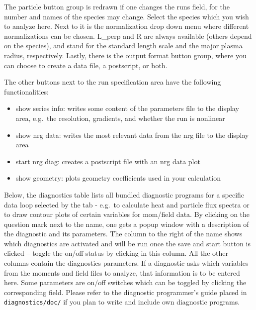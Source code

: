 \documentclass[12pt]{article}
\begin{document}
The particle button group is redrawn if one changes the runs
field, for the number and names of the species may change. Select
the species which you wish to analyze here. Next to it is the
normalization drop down menu where different normalizations can be
chosen. L\_perp and R are always available (others depend on the
species), and stand for the standard \gene length scale and the
major plasma radius, respectively. Lastly, there is the output
format button group, where you can choose to create a data file, a
postscript, or both.

The other buttons next to the run specification area have the
following functionalities:
\begin{itemize}
\item show series info: writes some content of the parameters file
to the display area, e.g.~the resolution, gradients, and whether
the run is nonlinear
\item show nrg data: writes the most relevant data from the nrg
file to the display area
\item start nrg diag: creates a postscript file with an nrg data plot
\item show geometry: plots geometry coefficients used in your
\gene calculation
\end{itemize}

Below, the diagnostics table lists all bundled diagnostic
programs for a specific data loop selected by the tab
- e.g.~to calculate heat and particle flux spectra or
to draw contour plots of certain variables for mom/field data.
By clicking on the question mark next to the name, one
gets a popup window with a description of the diagnostic and its
parameters. The column to the right of the name shows which
diagnostics are activated and will be run once the save and start
button is clicked -- toggle the on/off status by clicking in this
column. All the other columns contain the diagnostics parameters.
If a diagnostic asks which variables from the moments and field
files to analyze, that information is to be entered here. Some
parameters are on/off switches which can be toggled by clicking
the corresponding field. Please refer to the diagnostic
programmer's guide placed in \verb|diagnostics/doc/| if you plan
to write and include own diagnostic programs.
\end{document}
